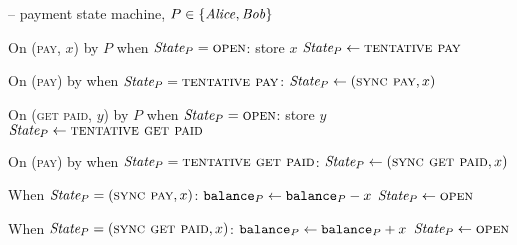\begin{center}
  \begin{systembox}{\fchan{} -- payment state machine, $P \in \{\mathit{Alice}, \mathit{Bob}\}$}
    \begin{algorithmic}[1]
      \State On (\textsc{pay}, $x$) by $P$ when $\itistate_P =
      \textsc{open}$: 
      \label{code:functionality:pay:when-tent-pay}
      \Indent
        \State store $x$
        \label{code:functionality:pay:store-pay}
        \State $\itistate_P \gets \textsc{tentative pay}$
      \EndIndent
      \Statex

      \State On (\textsc{pay}) by \adversary when $\itistate_P =
      \textsc{tentative pay}$: 
      \label{code:functionality:pay:when-sync-pay}
      \Indent
        \State $\itistate_P \gets (\textsc{sync pay}, x)$
      \EndIndent
      \Statex

      \State On (\textsc{get paid}, $y$) by $P$ when $\itistate_P =
      \textsc{open}$: 
      \label{code:functionality:pay:when-tent-get-paid}
      \Indent
        \State store $y$
        \label{code:functionality:pay:store-get-paid}
        \State $\itistate_P \gets \textsc{tentative get paid}$
      \EndIndent
      \Statex

      \State On (\textsc{pay}) by \adversary when $\itistate_P =
      \textsc{tentative get paid}$: 
      \label{code:functionality:pay:when-sync-get-paid}
      \Indent
        \State $\itistate_P \gets (\textsc{sync get paid}, x)$
      \EndIndent
      \Statex

      \State When $\itistate_P = (\textsc{sync pay}, x)$:
      \Indent
          \State $\texttt{balance}_{P} \gets \texttt{balance}_{P} - x$
          \label{code:functionality:pay:decrement}
          \State {}
          \State $\itistate_P \gets \textsc{open}$
          \label{code:functionality:pay:pay-end}
        \EndIf
      \EndIndent
      \Statex

      \State When $\itistate_P = (\textsc{sync get paid}, x)$:
      \Indent
          \State $\texttt{balance}_{P} \gets \texttt{balance}_{P} + x$
          \label{code:functionality:pay:increment}
          \State {}
          \State $\itistate_P \gets \textsc{open}$
          \label{code:functionality:pay:get-paid-end}
        \EndIf
      \EndIndent
    \end{algorithmic}
  \end{systembox}
  \label{code:functionality:pay}
\end{center} \ \\

